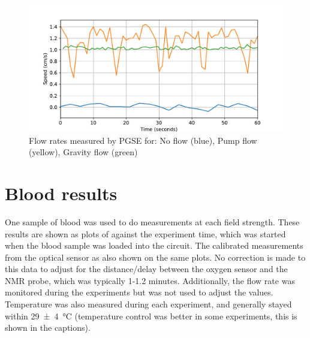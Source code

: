 \begin{figure}[htb]
\centering
\includegraphics[width=\textwidth]{figures/contflow/flowstabilityspeed.pdf}
\caption[Flow rate stability for different continuous flow setups]{Flow rates measured by PGSE for: No flow (blue), Pump flow (yellow), Gravity flow (green)}
\label{fig:contflow-flowstabilityspeed}
\end{figure}

\section{Blood results}

One sample of blood was used to do measurements at each field strength.
These results are shown as plots of \Ttwo against the experiment time, which was started when the blood sample was loaded into the circuit.
The calibrated \SOtwo measurements from the optical sensor as also shown on the same plots.
No correction is made to this data to adjust for the distance/delay between the oxygen sensor and the NMR probe, which was typically 1-1.2 minutes.
Additionally, the flow rate was monitored during the experiments but was not used to adjust the \Ttwo values.
Temperature was also measured during each experiment, and generally stayed within \SI{29\pm4}{\celsius} (temperature control was better in some experiments, this is shown in the captions).

